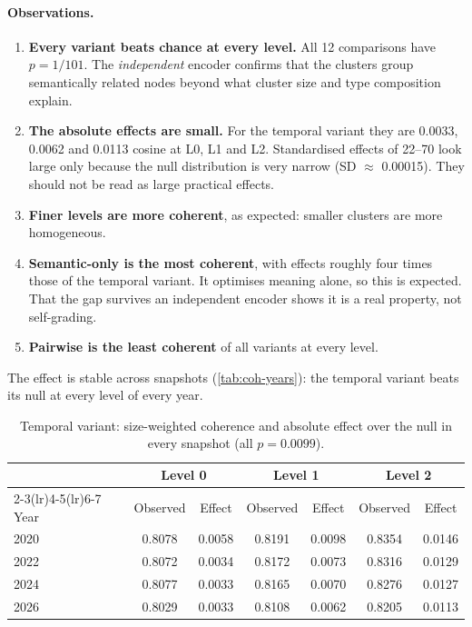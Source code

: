 \documentclass[11pt,a4paper]{article}
\newcommand{\cref}[1]{\autoref{#1}}
\theoremstyle{remark}
\begin{document}
\paragraph{Observations.}
\begin{enumerate}
  \item \textbf{Every variant beats chance at every level.} All 12 comparisons have
        $p=1/101$. The \emph{independent} encoder confirms that the clusters group
        semantically related nodes beyond what cluster size and type composition explain.
  \item \textbf{The absolute effects are small.} For the temporal variant they are
        0.0033, 0.0062 and 0.0113 cosine at L0, L1 and L2. Standardised effects of 22--70
        look large only because the null distribution is very narrow (SD $\approx$ 0.00015).
        They should not be read as large practical effects.
  \item \textbf{Finer levels are more coherent}, as expected: smaller clusters are more
        homogeneous.
  \item \textbf{Semantic-only is the most coherent}, with effects roughly four times
        those of the temporal variant. It optimises meaning alone, so this is expected. That
        the gap survives an independent encoder shows it is a real property, not
        self-grading.
  \item \textbf{Pairwise is the least coherent} of all variants at every level.
\end{enumerate}

The effect is stable across snapshots (\cref{tab:coh-years}): the temporal variant beats
its null at every level of every year.

\begin{table}[!htbp]
\centering
\caption{Temporal variant: size-weighted coherence and absolute effect over the null in every
snapshot (all $p=0.0099$).}
\label{tab:coh-years}
\small
\begin{tabular}{lcccccc}
\toprule
& \multicolumn{2}{c}{Level 0} & \multicolumn{2}{c}{Level 1} & \multicolumn{2}{c}{Level 2}\\
\cmidrule(lr){2-3}\cmidrule(lr){4-5}\cmidrule(lr){6-7}
Year & Observed & Effect & Observed & Effect & Observed & Effect\\
\midrule
2020 & 0.8078 & 0.0058 & 0.8191 & 0.0098 & 0.8354 & 0.0146\\
2022 & 0.8072 & 0.0034 & 0.8172 & 0.0073 & 0.8316 & 0.0129\\
2024 & 0.8077 & 0.0033 & 0.8165 & 0.0070 & 0.8276 & 0.0127\\
2026 & 0.8029 & 0.0033 & 0.8108 & 0.0062 & 0.8205 & 0.0113\\
\bottomrule
\end{tabular}
\end{table}
\end{document}

